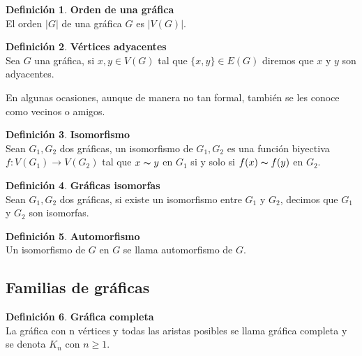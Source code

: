 \documentclass[11pt]{book}
\theoremstyle{definition}
\newtheorem{definition}{Definición}
\newcounter{in}
\newcounter{ini}
\begin{document}
\begin{definition}\textbf{Orden de una gráfica}\\
El orden $|G|$ de una gráfica $G$ es $|V(G)|$.
\end{definition}

\begin{definition}\textbf{Vértices adyacentes}\\
Sea $G$ una gráfica, si $x , y \in V(G)$ tal que
$\{x,y\}\in E(G)$ diremos que $x$ y $y$ son adyacentes.
\end{definition}

En algunas ocasiones, aunque de manera no tan formal, también se les
conoce como vecinos o amigos.




\begin{definition}\textbf{Isomorfismo}\\
Sean $G_1,G_2$ dos gráficas, un isomorfismo de
$G_1,G_2$ es una función biyectiva $f:
V(G_1)\rightarrow V(G_2)$ tal que $x\thicksim y$ en
$G_1$ si y solo si $f(x)\thicksim f(y)$ en $G_2$.
\end{definition}


\begin{definition}\textbf{Gráficas isomorfas}\\
Sean $G_1,G_2$ dos gráficas, si existe un isomorfismo
entre $G_1$ y $G_2$, decimos que $G_1$ y $G_2$
son isomorfas.
\end{definition}


\begin{definition}\textbf{Automorfismo}\\
Un isomorfismo de $G$ en $G$ se llama automorfismo de
$G$.
\end{definition}





\subsection{Familias de gráficas}


\begin{definition}\textbf{Gráfica completa}\\
La gráfica con n vértices y todas las aristas posibles se llama
gráfica completa y se denota $K_n$ con $n\geq 1$.
\end{definition}
\end{document}
